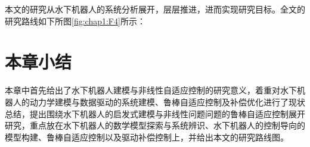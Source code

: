 


本文的研究从水下机器人的系统分析展开，层层推进，进而实现研究目标。全文的研究路线如下所图\ref{fig:chap1:F4}所示：







\section{本章小结 }

本章中首先给出了水下机器人建模与非线性自适应控制的研究意义，着重对水下机器人的动力学建模与数据驱动的系统建模、鲁棒自适应控制及补偿优化进行了现状总结，提出围绕水下机器人的启发式建模与非线性问题问题的鲁棒自适应控制展开研究，重点放在水下机器人的数学模型探索与系统辨识、水下机器人的控制导向的模型构建、鲁棒自适应控制以及驱动补偿控制上，并给出本文的研究路线图。
